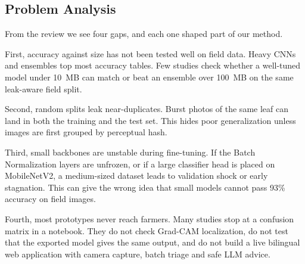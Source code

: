 \subsection{Problem Analysis}
From the review we see four gaps, and each one shaped part of our method.

First, accuracy against size has not been tested well on field data. Heavy CNNs and ensembles top most accuracy tables. Few studies check whether a well-tuned model under 10~MB can match or beat an ensemble over 100~MB on the same leak-aware field split.

Second, random splits leak near-duplicates. Burst photos of the same leaf can land in both the training and the test set. This hides poor generalization unless images are first grouped by perceptual hash.

Third, small backbones are unstable during fine-tuning. If the Batch Normalization layers are unfrozen, or if a large classifier head is placed on MobileNetV2, a medium-sized dataset leads to validation shock or early stagnation. This can give the wrong idea that small models cannot pass 93\% accuracy on field images.

Fourth, most prototypes never reach farmers. Many studies stop at a confusion matrix in a notebook. They do not check Grad-CAM localization, do not test that the exported model gives the same output, and do not build a live bilingual web application with camera capture, batch triage and safe LLM advice.
